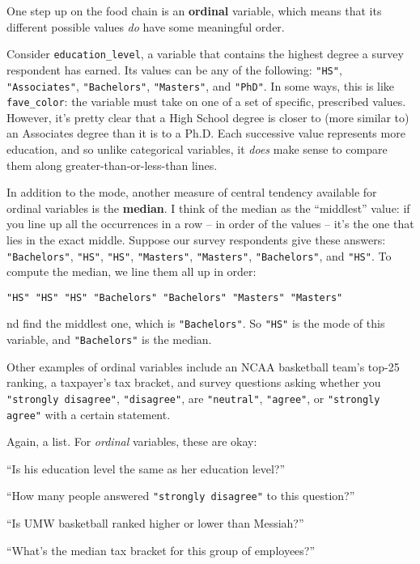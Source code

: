 One step up on the food chain is an \textbf{ordinal} variable, which means that
its different possible values \textit{do} have some meaningful order.

Consider \texttt{education\_level}, a variable that contains the highest degree
a survey respondent has earned. Its values can be any of the following:
\texttt{"HS"}, \texttt{"Associates"}, \texttt{"Bachelors"}, \texttt{"Masters"},
and \texttt{"PhD"}. In some ways, this is like \texttt{fave\_color}: the
variable must take on one of a set of specific, prescribed values. However,
it's pretty clear that a High School degree is closer to (more similar to) an
Associates degree than it is to a Ph.D. Each successive value represents more
education, and so unlike categorical variables, it \textit{does} make sense to
compare them along greater-than-or-less-than lines.

In addition to the mode, another measure of central tendency available for
ordinal variables is the \textbf{median}. I think of the median as the
``middlest'' value: if you line up all the occurrences in a row -- in order of
the values -- it's the one that lies in the exact middle. Suppose our survey
respondents give these answers: \texttt{"Bachelors"}, \texttt{"HS"},
\texttt{"HS"}, \texttt{"Masters"}, \texttt{"Masters"}, \texttt{"Bachelors"},
and \texttt{"HS"}. To compute the median, we line them all up in order:

\begin{center}
\texttt{"HS"  "HS"  "HS"  "Bachelors"  "Bachelors"  "Masters"  "Masters"}
\end{center}

nd find the middlest one, which is \texttt{"Bachelors"}. So \texttt{"HS"} is
the mode of this variable, and \texttt{"Bachelors"} is the median.

Other examples of ordinal variables include an NCAA basketball team's top-25
ranking, a taxpayer's tax bracket, and survey questions asking whether you
\texttt{"strongly disagree"}, \texttt{"disagree"}, are \texttt{"neutral"},
\texttt{"agree"}, or \texttt{"strongly agree"} with a certain statement.

Again, a list. For \textit{ordinal} variables, these are okay:

\begin{compactitem}
\item[\leftthumbsup] ``Is his education level the same as her education level?''
\item[\leftthumbsup] ``How many people answered \texttt{"strongly disagree"} to
this question?''
\item[\leftthumbsup] ``Is UMW basketball ranked higher or lower than Messiah?''
\item[\leftthumbsup] ``What's the median tax bracket for this group of
employees?''
\end{compactitem}

